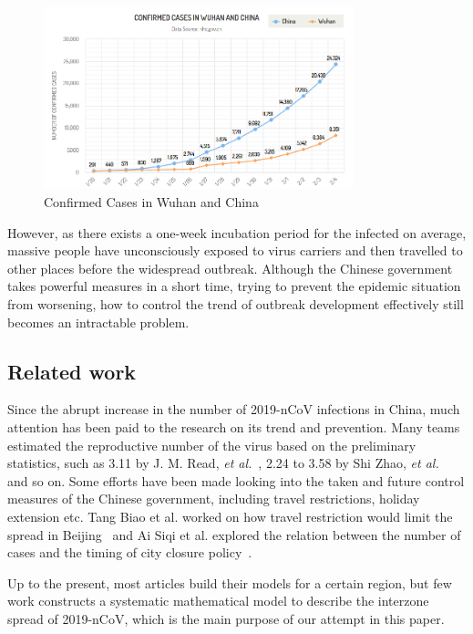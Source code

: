 \documentclass[12pt]{mcmthesis}
\begin{document}
\begin{figure}[h]
    \centering
    \includegraphics[width=0.8\textwidth]{figure/Confirmed_Cases.png}
    \caption{Confirmed Cases in Wuhan and China}
    \label{fig:Conf_Cases}
\end{figure}

However, as there exists a one-week incubation period for the infected on average, massive people have unconsciously exposed to virus carriers and then travelled to other places before the widespread outbreak. Although the Chinese government takes powerful measures in a short time, trying to prevent the epidemic situation from worsening, how to control the trend of outbreak development effectively still becomes an intractable problem.

\subsection{Related work}
Since the abrupt increase in the number of 2019-nCoV infections in China, much attention has been paid to the research on its trend and prevention. Many teams estimated the reproductive number of the virus based on the preliminary statistics, such as 3.11 by J. M. Read, \textit{et al.}~\cite{early_est}, 2.24 to 3.58 by Shi Zhao, \textit{et al.}~\cite{pre_est} and so on. Some efforts have been made looking into the taken and future control measures of the Chinese government, including travel restrictions, holiday extension etc. Tang Biao et al. worked on how travel restriction would limit the spread in Beijing~\cite{trans_risk} and Ai Siqi et al. explored the relation between the number of cases and the timing of city closure policy~\cite{city_closure}.

Up to the present, most articles build their models for a certain region, but few work constructs a systematic mathematical model to describe the interzone spread of 2019-nCoV, which is the main purpose of our attempt in this paper.
\end{document}
